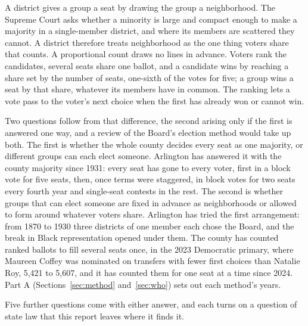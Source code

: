 A district gives a group a seat by drawing the group a neighborhood. The Supreme
Court asks whether a minority is large and compact enough to make a majority in a
single-member district, and where its members are scattered they
cannot.\autocite[50]{thornburgvgingles1986} A district therefore treats
neighborhood as the one thing voters share that counts. A proportional count draws
no lines in advance. Voters rank the candidates, several seats share one ballot,
and a candidate wins by reaching a share set by the number of seats, one-sixth of
the votes for five;\autocite[6]{mggg2021portland} a group wins a seat by that
share, whatever its members have in common. The ranking lets a vote pass to the
voter's next choice when the first has already won or cannot
win.\autocite{vaacts2020c713}

Two questions follow from that difference, the second arising only if the first is
answered one way, and a review of the Board's election method would take up both.
The first is whether the whole county decides every seat as one majority, or
different groups can each elect someone. Arlington has answered it with the county
majority since 1931: every seat has gone to every voter, first in a block vote for
five seats, then, once terms were staggered, in block votes for two seats every
fourth year and single-seat contests in the
rest.\autocite[67]{anderson1958}\fnsep\autocite[37]{arlhist1967officials} The second
is whether groups that can elect someone are fixed in advance as neighborhoods or
allowed to form around whatever voters share. Arlington has tried the first
arrangement: from 1870 to 1930 three districts of one member each chose the Board,
and the break in Black representation opened under
them.\autocite[art.~VII, sec.~2]{vaconstitution1869}\fnsep\autocite[ch.~76, secs.~4
and 14]{vaacts1870} The county has counted ranked ballots to fill several seats once,
in the 2023 Democratic primary, where Maureen Coffey was nominated on transfers with
fewer first choices than Natalie Roy, 5,421 to 5,607, and it has counted them for one
seat at a time since
2024.\autocite[contest 160326]{vaelections}\fnsep\autocite{arlnow2023coffeyprimary}\fnsep\autocite{arlingtonboard2026rcv}
Part A (Sections~\ref{sec:method} and~\ref{sec:who}) sets out each method's
years.

Five further questions come with either answer, and each turns on a question of
state law that this report leaves where it finds it.

